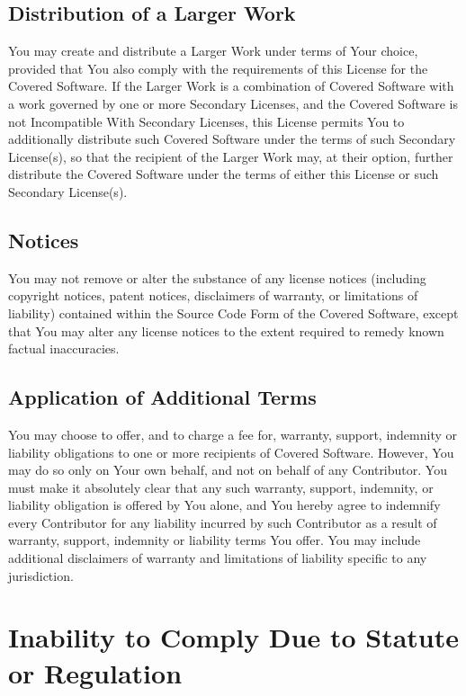 \documentclass[a4paper, 12pt]{article}
\begin{document}
\subsection{Distribution of a Larger Work}

You may create and distribute a Larger Work under terms of Your choice, provided that You also comply with the requirements of this License for the Covered Software. If the Larger Work is a combination of Covered Software with a work governed by one or more Secondary Licenses, and the Covered Software is not Incompatible With Secondary Licenses, this License permits You to additionally distribute such Covered Software under the terms of such Secondary License(s), so that the recipient of the Larger Work may, at their option, further distribute the Covered Software under the terms of either this License or such Secondary License(s).

\subsection{Notices}

You may not remove or alter the substance of any license notices (including copyright notices, patent notices, disclaimers of warranty, or limitations of liability) contained within the Source Code Form of the Covered Software, except that You may alter any license notices to the extent required to remedy known factual inaccuracies.

\subsection{Application of Additional Terms}

You may choose to offer, and to charge a fee for, warranty, support, indemnity or liability obligations to one or more recipients of Covered Software. However, You may do so only on Your own behalf, and not on behalf of any Contributor. You must make it absolutely clear that any such warranty, support, indemnity, or liability obligation is offered by You alone, and You hereby agree to indemnify every Contributor for any liability incurred by such Contributor as a result of warranty, support, indemnity or liability terms You offer. You may include additional disclaimers of warranty and limitations of liability specific to any jurisdiction.

\section{Inability to Comply Due to Statute or Regulation}
\end{document}
